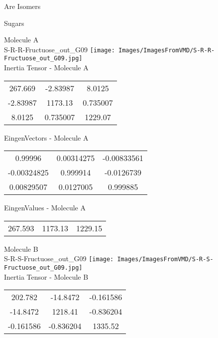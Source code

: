 \begin{center}
\vtab
\vtab
\textcolor{NavyBlue}{\Large Are Isomers}
\end{center}
\newpage

\vtab[-2cm]
\begin{center}
{\large Sugars}
\end{center}
\begin{multicols}{2}
\begin{center}
Molecule A \\ 
S-R-R-Fructuose\_out\_G09
\texttt{[image: Images/ImagesFromVMD/S-R-R-Fructuose\_out\_G09.jpg]}
\\
Inertia Tensor - Molecule A \\
\vtab
\begin{tabular}{|c c c|}
267.669	 & 	-2.83987	 & 	8.0125	 \\
-2.83987	 & 	1173.13	 & 	0.735007	 \\
8.0125	 & 	0.735007	 & 	1229.07
\end{tabular}

\vtab
 EingenVectors - Molecule A     \\
\vtab
\begin{tabular}{|c c c|}
0.99996	 & 	0.00314275	 & 	-0.00833561	 \\
-0.00324825	 & 	0.999914	 & 	-0.0126739	 \\
0.00829507	 & 	0.0127005	 & 	0.999885
\end{tabular}

\vtab
 EingenValues - Molecule A     \\
\vtab
\begin{tabular}{|c c c|}
267.593	 & 	1173.13	 & 	1229.15
\end{tabular}
\columnbreak

Molecule B \\ 
S-R-S-Fructuose\_out\_G09
\texttt{[image: Images/ImagesFromVMD/S-R-S-Fructuose\_out\_G09.jpg]}
\\
Inertia Tensor - Molecule B \\
\vtab
\begin{tabular}{|c c c|}
202.782	 & 	-14.8472	 & 	-0.161586	 \\
-14.8472	 & 	1218.41	 & 	-0.836204	 \\
-0.161586	 & 	-0.836204	 & 	1335.52
\end{tabular}


\end{center}
\end{multicols}
